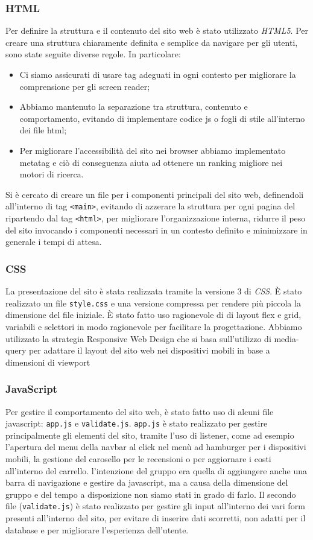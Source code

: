 \documentclass[11pt]{article}
\begin{document}
\subsubsection{HTML}
\label{sec:org7a3deaf}
Per definire la struttura e il contenuto del sito web è stato utilizzato \emph{HTML5}. Per creare una struttura chiaramente definita e semplice da navigare per gli utenti, sono state seguite diverse regole. In particolare:
\begin{itemize}
\item Ci siamo assicurati di usare tag adeguati in ogni contesto per migliorare la comprensione per gli screen reader;
\item Abbiamo mantenuto la separazione tra struttura, contenuto e comportamento, evitando di implementare codice js o fogli di stile all'interno dei file html;
\item Per migliorare l'accessibilità del sito nei browser abbiamo implementato metatag e ciò di conseguenza aiuta ad ottenere un ranking migliore nei motori di ricerca.
\end{itemize}
Si è cercato di creare un file per i componenti principali del sito web, definendoli all'interno di tag \texttt{<main>}, evitando di azzerare la struttura per ogni pagina del ripartendo dal tag \texttt{<html>}, per migliorare l'organizzazione interna, ridurre il peso del sito invocando i componenti necessari in un contesto definito e minimizzare in generale i tempi di attesa.
\subsubsection{CSS}
\label{sec:org9fda54c}
La presentazione del sito è stata realizzata tramite la versione 3 di \emph{CSS}. È stato realizzato un file \texttt{style.css} e una versione compressa per rendere più piccola la dimensione del file iniziale. È stato fatto uso ragionevole di di layout flex e grid, variabili e selettori in modo ragionevole per facilitare la progettazione. Abbiamo utilizzato la strategia Responsive Web Design che si basa sull'utilizzo di media-query per adattare il layout del sito web nei dispositivi mobili in base a dimensioni di viewport
\subsubsection{JavaScript}
\label{sec:orgde38eb4}
Per gestire il comportamento del sito web, è stato fatto uso di alcuni file javascript: \texttt{app.js} e \texttt{validate.js}. \texttt{app.js} è stato realizzato per gestire principalmente gli elementi del sito, tramite l'uso di listener, come ad esempio l'apertura del menu della navbar al click nel menù ad hamburger per i dispositivi mobili, la gestione del carosello per le recensioni o per aggiornare i costi all'interno del carrello. l'intenzione del gruppo era quella di aggiungere anche una barra di navigazione e gestire da javascript, ma a causa  della dimensione del gruppo e del tempo a disposizione non siamo stati in grado di farlo. Il secondo file (\texttt{validate.js}) è stato realizzato per gestire gli input all'interno dei vari form presenti all'interno del sito, per evitare di inserire dati scorretti, non adatti per il database e per migliorare l'esperienza dell'utente.
\end{document}

